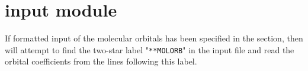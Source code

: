\pagebreak[3]
\section{\label{sec:ref-molorbinp}  input module}

If formatted input of the molecular orbitals has been specified in
the  section, then {\sir} will attempt to find
the two-star label "\verb|**MOLORB|" in the input file and read
the orbital coefficients from the lines following this label.

